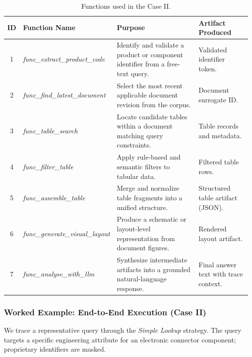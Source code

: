 \documentclass[largeformat]{interact}
\begin{document}
\begin{table}[!htbp]
\captionsetup{width=0.92\linewidth, skip=2pt}
    \caption{Functions used in the Case II.}
    \label{tab:caseII_function_library}
    \centering
    \small
    \setlength{\tabcolsep}{5pt}
    \renewcommand{\arraystretch}{1.1}
    \begin{tabularx}{\textwidth}{c >{\raggedright\arraybackslash}p{4.2cm} p{6.0cm} X}
    \toprule
    \textbf{ID} &
    \textbf{Function Name} &
    \textbf{Purpose} &
    \textbf{Artifact Produced} \\
    \midrule
    1 & \textit{func\_extract\_product\_code} &
    Identify and validate a product or component identifier from a free-text query. &
    Validated identifier token. \\
    \midrule
    2 & \textit{func\_find\_latest\_document} &
    Select the most recent applicable document revision from the corpus. &
    Document surrogate ID. \\
    \midrule
    3 & \textit{func\_table\_search} &
    Locate candidate tables within a document matching query constraints. &
    Table records and metadata. \\
    \midrule
    4 & \textit{func\_filter\_table} &
    Apply rule-based and semantic filters to tabular data. &
    Filtered table rows. \\
    \midrule
    5 & \textit{func\_assemble\_table} &
    Merge and normalize table fragments into a unified structure. &
    Structured table artifact (JSON). \\
    \midrule
    6 & \textit{func\_generate\_visual\_layout }&
    Produce a schematic or layout-level representation from document figures. &
    Rendered layout artifact. \\
    \midrule
    7 & \textit{func\_analyse\_with\_llm}&
    Synthesize intermediate artifacts into a grounded natural-language response. &
    Final answer text with trace context. \\
    \bottomrule
    \end{tabularx}
\end{table}

\subsubsection{Worked Example: End-to-End Execution (Case II)}
We trace a representative query through the \emph{Simple Lookup} strategy. The query targets a specific engineering attribute for an electronic connector component; proprietary identifiers are masked.
\end{document}
